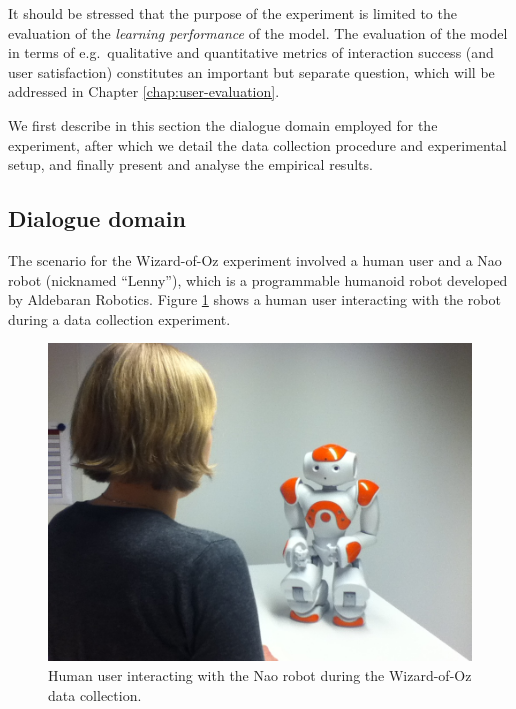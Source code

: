 
It should be stressed that the purpose of the experiment is limited to the evaluation of the \textit{learning performance} of the model. The evaluation of the model in terms of e.g.\ qualitative and quantitative metrics of interaction success (and user satisfaction) constitutes an important but separate question, which will be addressed in Chapter \ref{chap:user-evaluation}. 

We first describe in this section the dialogue domain employed for the experiment, after which we detail the data collection procedure and experimental setup, and finally present and analyse the empirical results. 

\subsection{Dialogue domain}
\label{sec:wozlearning-experiments-domain}

The scenario for the Wizard-of-Oz experiment involved a human user and a Nao robot (nicknamed ``Lenny''), which is a programmable humanoid robot developed by Aldebaran Robotics. Figure \ref{fig:nao2} shows a human user interacting with the robot during a data collection experiment. 

\begin{figure}[ht]
\begin{center}
\includegraphics[scale=0.25]{imgs/bilde.jpg}
\end{center}
\caption{Human user interacting with the Nao robot during the Wizard-of-Oz data collection.}
\label{fig:nao2}
\end{figure}

